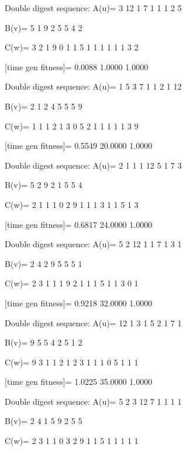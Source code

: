 Double digest sequence:
A(u)=
     3    12     1     7     1     1     1     2     5

B(v)=
     5     1     9     2     5     5     4     2

C(w)=
     3     2     1     9     0     1     1     5     1     1     1     1     1     1     3     2

[time gen fitness]=
    0.0088    1.0000    1.0000

Double digest sequence:
A(u)=
     1     5     3     7     1     1     2     1    12

B(v)=
     2     1     2     4     5     5     5     9

C(w)=
     1     1     1     2     1     3     0     5     2     1     1     1     1     1     3     9

[time gen fitness]=
    0.5549   20.0000    1.0000

Double digest sequence:
A(u)=
     2     1     1     1    12     5     1     7     3

B(v)=
     5     2     9     2     1     5     5     4

C(w)=
     2     1     1     1     0     2     9     1     1     1     3     1     1     5     1     3

[time gen fitness]=
    0.6817   24.0000    1.0000

Double digest sequence:
A(u)=
     5     2    12     1     1     7     1     3     1

B(v)=
     2     4     2     9     5     5     5     1

C(w)=
     2     3     1     1     1     9     2     1     1     1     5     1     1     3     0     1

[time gen fitness]=
    0.9218   32.0000    1.0000

Double digest sequence:
A(u)=
    12     1     3     1     5     2     1     7     1

B(v)=
     9     5     5     4     2     5     1     2

C(w)=
     9     3     1     1     2     1     2     3     1     1     1     0     5     1     1     1

[time gen fitness]=
    1.0225   35.0000    1.0000

Double digest sequence:
A(u)=
     5     2     3    12     7     1     1     1     1

B(v)=
     2     4     1     5     9     2     5     5

C(w)=
     2     3     1     1     0     3     2     9     1     1     5     1     1     1     1     1

